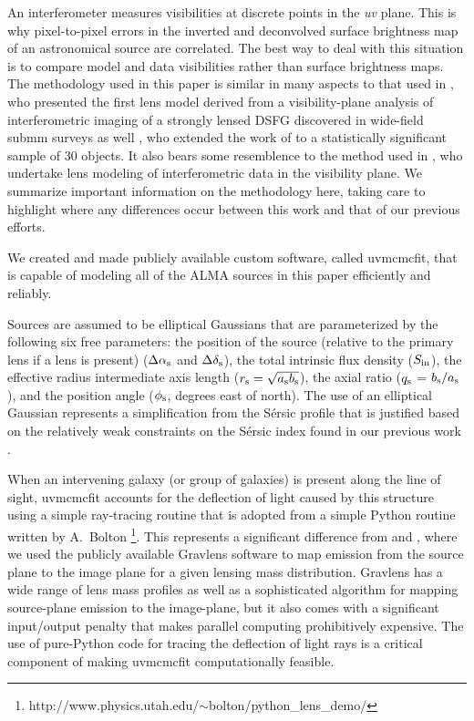 \documentclass[iop]{emulateapj}
\begin{document}
An interferometer measures visibilities at discrete points in the {\it uv}
plane.  This is why pixel-to-pixel errors in the inverted and deconvolved
surface brightness map of an astronomical source are correlated.  The best way
to deal with this situation is to compare model and data visibilities rather
than surface brightness maps.  The methodology used in this paper is similar in
many aspects to that used in \citet{Bussmann:2012lr}, who presented the first
lens model derived from a visibility-plane analysis of interferometric imaging
of a strongly lensed DSFG discovered in wide-field submm surveys as well
\citet{Bussmann:2013lr}, who extended the work of \citet{Bussmann:2012lr} to a
statistically significant sample of 30 objects.  It also bears some resemblence
to the method used in \citet{Hezaveh:2013fk}, who undertake lens modeling of
interferometric data in the visibility plane.  We summarize important
information on the methodology here, taking care to highlight where any
differences occur between this work and that of our previous efforts.

We created and made publicly available custom software, called {\sc uvmcmcfit},
that is capable of modeling all of the ALMA sources in this paper efficiently
and reliably.  

Sources are assumed to be elliptical Gaussians that are parameterized by the
following six free parameters: the position of the source (relative to the
primary lens if a lens is present) ($\Delta \alpha_{\rm s}$ and $\Delta
\delta_{\rm s}$), the total intrinsic flux density ($S_{\rm in}$), the
effective radius intermediate axis length ($r_{\rm s} = \sqrt{a_{\rm s} b_{\rm
s}}$), the axial ratio ($q_{\rm s}$ =  $b_{\rm s}/a_{\rm s}$), and the position
angle ($\phi_{\rm s}$, degrees east of north).  The use of an elliptical
Gaussian represents a simplification from the S\'ersic profile
\citep{1968adga.book.....S}  that is justified based on the relatively weak
constraints on the S\'ersic index found in our previous work
\citep{Bussmann:2012lr, Bussmann:2013lr}.

When an intervening galaxy (or group of galaxies) is present along the line of
sight, {\sc uvmcmcfit} accounts for the deflection of light caused by this
structure using a simple ray-tracing routine that is adopted from a simple
Python routine written by A.~Bolton
\footnote{http://www.physics.utah.edu/$\sim$bolton/python\_lens\_demo/}.  This
represents a significant difference from \citet{Bussmann:2012lr} and
\citet{Bussmann:2013lr}, where we used the publicly available {\sc Gravlens}
software \citep{Keeton:2001lr} to map emission from the source plane to
the image plane for a given lensing mass distribution.  {\sc Gravlens} has a
wide range of lens mass profiles as well as a sophisticated algorithm for
mapping source-plane emission to the image-plane, but it also comes with a
significant input/output penalty that makes parallel computing prohibitively
expensive.  The use of pure-Python code for tracing the deflection of light
rays is a critical component of making {\sc uvmcmcfit} computationally
feasible.
\end{document}
